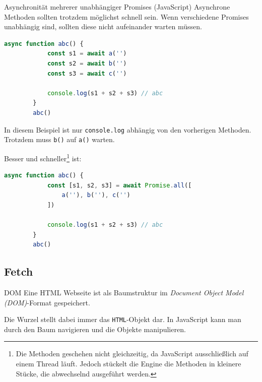 \begin{bonus}{Asynchronität mehrerer unabhängiger Promises (JavaScript)}
    Asynchrone Methoden sollten trotzdem möglichst schnell sein.
    Wenn verschiedene Promises unabhängig sind, sollten diese nicht aufeinander warten müssen.

    \begin{lstlisting}[language=JavaScript]
        async function abc() {
            const s1 = await a('')
            const s2 = await b('')
            const s3 = await c('')

            console.log(s1 + s2 + s3) // abc
        }
        abc()
    \end{lstlisting}
    In diesem Beispiel ist nur \texttt{console.log} abhängig von den vorherigen Methoden.
    Trotzdem muss \texttt{b()} auf \texttt{a()} warten.

    Besser und schneller\footnote{
        Die Methoden geschehen nicht gleichzeitig, da JavaScript ausschließlich auf einem Thread läuft.
        Jedoch stückelt die Engine die Methoden in kleinere Stücke, die abwechselnd ausgeführt werden.
    } ist:
    \begin{lstlisting}[language=JavaScript]
        async function abc() {
            const [s1, s2, s3] = await Promise.all([
                a(''), b(''), c('')
            ])

            console.log(s1 + s2 + s3) // abc
        }
        abc()
    \end{lstlisting}
\end{bonus}

\subsection{Fetch}

\begin{defi}{DOM}
    Eine HTML Webseite ist als Baumstruktur im \emph{Document Object Model (DOM)}-Format gespeichert.

    Die Wurzel stellt dabei immer das \texttt{HTML}-Objekt dar.
    In JavaScript kann man durch den Baum navigieren und die Objekte manipulieren.
\end{defi}

